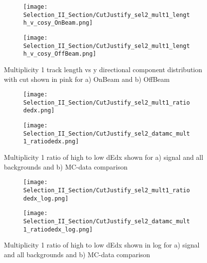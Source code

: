 \documentclass{article}
\begin{document}
\begin{figure}[h!]
\centering
  \begin{subfigure}[t]{0.25\textwidth}
    \centering
\texttt{[image: Selection\_II\_Section/CutJustify\_sel2\_mult1\_length\_v\_cosy\_OnBeam.png]}
    \caption{ }
  \end{subfigure} 
  \hspace{20mm}
  \begin{subfigure}[t]{0.25\textwidth}
    \centering
    \texttt{[image: Selection\_II\_Section/CutJustify\_sel2\_mult1\_length\_v\_cosy\_OffBeam.png]}
    \caption{ }
  \end{subfigure} 

\caption{Multiplicity 1 track length vs y directional component distribution with cut shown in pink for a) OnBeam and b) OffBeam }
\label{fig:cutjust_sel2_onbeam_mult1_len_v_cosy}
\end{figure}


\begin{figure}[h!]
\centering
  \begin{subfigure}[t]{0.4\textwidth}
    \centering
\texttt{[image: Selection\_II\_Section/CutJustify\_sel2\_mult1\_ratiodedx.png]}
    \caption{ }
  \end{subfigure} 
  \hspace{20mm}
  \begin{subfigure}[t]{0.4\textwidth}
    \centering
\texttt{[image: Selection\_II\_Section/CutJustify\_sel2\_datamc\_mult1\_ratiodedx.png]}
    \caption{ }
  \end{subfigure} 
\caption{Multiplicity 1 ratio of high to low dEdx shown for a) signal and all backgrounds and b) MC-data comparison }
\label{fig:cutjust_sel2_mult1_ratiodedx}
\end{figure}

\begin{figure}[h!]
\centering
  \begin{subfigure}[t]{0.4\textwidth}
    \centering
\texttt{[image: Selection\_II\_Section/CutJustify\_sel2\_mult1\_ratiodedx\_log.png]}
    \caption{ }
  \end{subfigure} 
  \hspace{20mm}
  \begin{subfigure}[t]{0.4\textwidth}
    \centering
\texttt{[image: Selection\_II\_Section/CutJustify\_sel2\_datamc\_mult1\_ratiodedx\_log.png]}
   \caption{ }
  \end{subfigure} 
\caption{Multiplicity 1 ratio of high to low dEdx shown in log for a) signal and all backgrounds and b) MC-data comparison }
\label{fig:cutjust_sel2_mult1_ratiodedx_log}
\end{figure}
\end{document}

